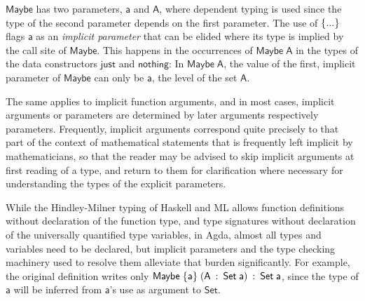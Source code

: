 \documentclass[copyright]{eptcs}
\newcommand{\Conid}[1]{\mathit{#1}}
\newcommand{\Varid}[1]{\mathit{#1}}
\def\resethooks{\global\let\SaveRestoreHook\empty
  \global\let\ColumnHook\empty}
\let\hspost\empty
\renewcommand\Varid[1]{\mathord{\textsf{#1}}}
\let\Conid\Varid
\newcommand\Keyword[1]{\textsf{\textbf{#1}}}
\newcounter{x}
\newcounter{y}
\begin{document}
\resethooks

\noindent
\ensuremath{\Conid{Maybe}} has two parameters, \ensuremath{\Varid{a}} and \ensuremath{\Conid{A}},
where dependent typing is used since the type of the second parameter
depends on the first parameter.
The use of \ensuremath{\{\mskip0.5mu \Varid{...}\mskip0.5mu\}} flags \ensuremath{\Varid{a}} as an \emph{implicit parameter}
that can be elided where its type is implied by the call site of \ensuremath{\Conid{Maybe}}.
This happens in the occurrences of \ensuremath{\Conid{Maybe}\;\Conid{A}} in the types of the data
constructors \ensuremath{\Varid{just}} and \ensuremath{\Varid{nothing}}:
In \ensuremath{\Conid{Maybe}\;\Conid{A}}, the value of the first, implicit parameter of \ensuremath{\Conid{Maybe}}
can only be \ensuremath{\Varid{a}}, the level of the set \ensuremath{\Conid{A}}.

The same applies to implicit function arguments,
and in most cases, implicit arguments or parameters
are determined by later arguments respectively parameters.
Frequently, implicit arguments correspond quite precisely
to that part of the context of mathematical statements
that is frequently left implicit by mathematicians,
so that the reader may be advised to skip implicit arguments at first
reading of a type,
and return to them for clarification where necessary for understanding
the types of the explicit parameters.

While the Hindley-Milner typing of Haskell and ML
allows function definitions without declaration of the function type,
and type signatures without declaration of the universally quantified
type variables,
in Agda, almost all types and variables need to be declared,
but implicit parameters and the type checking machinery used to
resolve them alleviate that burden significantly.
For example, the original definition writes only
\ensuremath{\Conid{Maybe}\;\{\mskip0.5mu \Varid{a}\mskip0.5mu\}\;(\Conid{A}\;\mathbin{:}\;\Conid{Set}\;\Varid{a})\;\mathbin{:}\;\Conid{Set}\;\Varid{a}},
since the type of \ensuremath{\Varid{a}} will be inferred from \ensuremath{\Varid{a}}'s use
as argument to \ensuremath{\Conid{Set}}.
\end{document}
